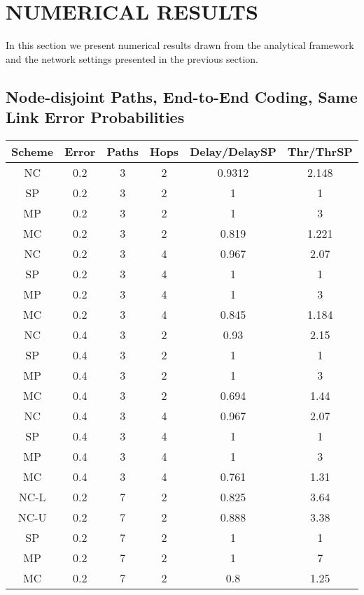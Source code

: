 \documentclass[journal, onecolumn, 12pt]{IEEEtran}
\begin{document}
\section{\uppercase{Numerical Results}}
\label{sec:numerical_results}

In this section we present numerical results drawn from the analytical framework and the network settings presented in the previous section.

\subsection{Node-disjoint Paths, End-to-End Coding, Same Link Error Probabilities}
\label{sec:numerical_node_disj}

\begin{table}[ht]
\centering
\begin{tabular}{c c c c c c}
\hline\hline
Scheme & Error & Paths & Hops & Delay/DelaySP & Thr/ThrSP\\ [0.5ex]
\hline
NC & 0.2 & 3 & 2 & 0.9312 & 2.148  \\
SP & 0.2 & 3 & 2 & 1 & 1  \\
MP & 0.2 & 3 & 2 & 1 & 3 \\
MC & 0.2 & 3 & 2 & 0.819 & 1.221 \\ [1ex]


NC & 0.2 & 3 & 4 & 0.967 & 2.07  \\
SP & 0.2 & 3 & 4 & 1 & 1  \\
MP & 0.2 & 3 & 4 & 1 & 3 \\
MC & 0.2 & 3 & 4 & 0.845 & 1.184 \\ [1ex]


NC & 0.4 & 3 & 2 & 0.93 & 2.15  \\
SP & 0.4 & 3 & 2 & 1 & 1  \\
MP & 0.4 & 3 & 2 & 1 & 3 \\
MC & 0.4 & 3 & 2 & 0.694 & 1.44 \\ [1ex]


NC & 0.4 & 3 & 4 & 0.967 & 2.07  \\
SP & 0.4 & 3 & 4 & 1 & 1  \\
MP & 0.4 & 3 & 4 & 1 & 3 \\
MC & 0.4 & 3 & 4 & 0.761 & 1.31 \\ [1ex]


NC-L & 0.2 & 7 & 2 & 0.825 & 3.64  \\
NC-U & 0.2 & 7 & 2 & 0.888 & 3.38  \\
SP & 0.2 & 7 & 2 & 1 &  1  \\
MP & 0.2 & 7 & 2 & 1 & 7 \\
MC & 0.2 & 7 & 2 & 0.8 & 1.25 \\ [1ex]



\end{tabular}
\end{table}
\end{document}
